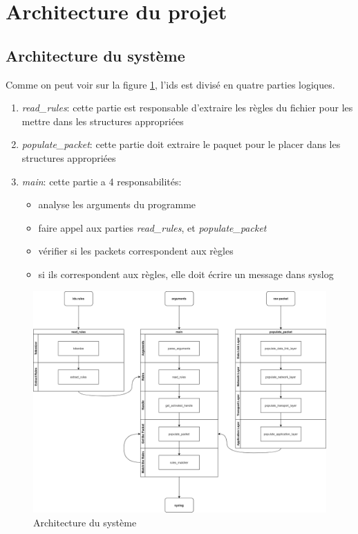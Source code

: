 \documentclass[a4paper]{article}
\begin{document}
\section{Architecture du projet}





\subsection{Architecture du système}



Comme on peut voir sur la figure \ref{fig:archsys}, l'ids est divisé en quatre parties logiques.
\begin{enumerate}
    \item \textit{read\_rules}: cette partie est responsable d'extraire les règles du fichier pour les mettre dans les structures appropriées
    \item \textit{populate\_packet}: cette partie doit extraire le paquet pour le placer dans les structures appropriées
    \item \textit{main}: cette partie a 4 responsabilités:
    \begin{itemize}
        \item analyse les arguments du programme
        \item faire appel aux parties \textit{read\_rules}, et \textit{populate\_packet}
        \item vérifier si les packets correspondent aux règles
        \item si ils correspondent aux règles, elle doit écrire un message dans syslog
    \end{itemize}
\end{enumerate}

\begin{figure}[H]
    \centering
    \includegraphics[width=0.99\linewidth]{../markdown-explanations/images/software-architecture-2.png}
    \caption{Architecture du système}
    \label{fig:archsys}
\end{figure}
\end{document}
